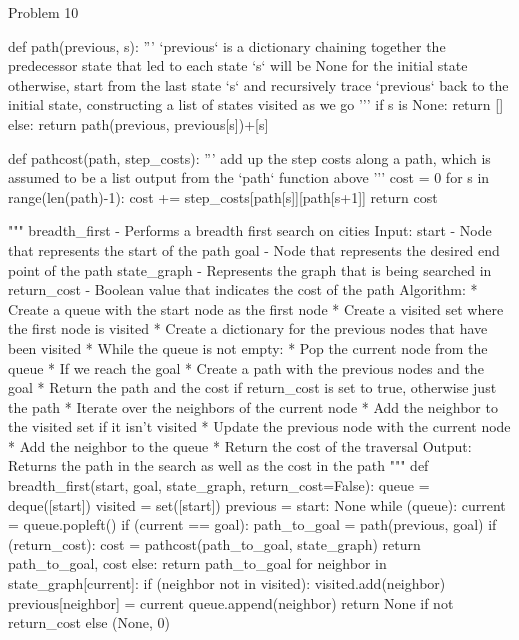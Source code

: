 \begin{problem}{Problem 10}
\begin{highlight}[Solution]
\begin{code}[Python]
    def path(previous, s): 
        '''
        `previous` is a dictionary chaining together the predecessor state that led to each state
        `s` will be None for the initial state
        otherwise, start from the last state `s` and recursively trace `previous` back to the initial state,
        constructing a list of states visited as we go
        '''
        if s is None:
            return []
        else:
            return path(previous, previous[s])+[s]
    
    def pathcost(path, step_costs):
        '''
        add up the step costs along a path, which is assumed to be a list output from the `path` function above
        '''
        cost = 0
        for s in range(len(path)-1):
            cost += step_costs[path[s]][path[s+1]]
        return cost
    
    
    """ breadth_first - Performs a breadth first search on cities
        Input:
            start - Node that represents the start of the path
            goal - Node that represents the desired end point of the path
            state_graph - Represents the graph that is being searched in
            return_cost - Boolean value that indicates the cost of the path
        Algorithm:
            * Create a queue with the start node as the first node
            * Create a visited set where the first node is visited
            * Create a dictionary for the previous nodes that have been visited
            * While the queue is not empty:
                * Pop the current node from the queue
                * If we reach the goal
                    * Create a path with the previous nodes and the goal
                    * Return the path and the cost if return_cost is set to true, otherwise just the path
                * Iterate over the neighbors of the current node
                * Add the neighbor to the visited set if it isn't visited
                * Update the previous node with the current node
                * Add the neighbor to the queue
            * Return the cost of the traversal
        Output:
            Returns the path in the search as well as the cost in the path
    """
    def breadth_first(start, goal, state_graph, return_cost=False):
        queue = deque([start])
        visited = set([start])
        previous = {start: None}
        while (queue):
            current = queue.popleft()
            if (current == goal):
                path_to_goal = path(previous, goal)
                if (return_cost):
                    cost = pathcost(path_to_goal, state_graph)
                    return path_to_goal, cost
                else:
                    return path_to_goal
            for neighbor in state_graph[current]:
                if (neighbor not in visited):
                    visited.add(neighbor)
                    previous[neighbor] = current
                    queue.append(neighbor)
        return None if not return_cost else (None, 0)
    

\end{code}
\end{highlight}
\end{problem}
